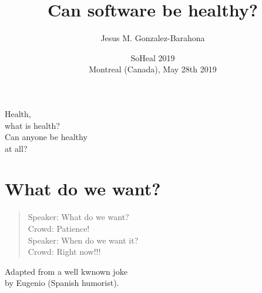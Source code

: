 \documentclass[17pt,aspectratio=169,hyperref=pdfusetitle]{beamer}
\title[Can software be healthy?]{Can software be healthy?}
\author[Jesus M. Gonzalez-Barahona]{Jesus M. Gonzalez-Barahona}
\institute[URJC]{Universidad Rey Juan Carlos \\
  @jgbarah ~~~~~ \url{http://jgbarah.github.io/presentations}}
\date[SoHeal 2019]{SoHeal 2019 \\ Montreal (Canada), May 28th 2019}
\begin{document}
\begin{frame}
  \maketitle
\end{frame}


\begin{frame}

  {\em
    \begin{center}
      Health, \\
      what is health? \\
      Can anyone be healthy \\
      at all? \\
    \end{center}
  }
\end{frame}





\section{What do we want?}

\begin{frame}[fragile]

  {\em
      \begin{quote}
      Speaker: What do we want? \\
      Crowd: Patience! \\
      Speaker: When do we want it? \\
      Crowd: Right now!!! \\
      \end{quote}
  }

  \begin{flushright}
    {\small Adapted from a well kwnown joke \\
    by Eugenio (Spanish humorist). \\}
  \end{flushright}
\end{frame}
\end{document}
